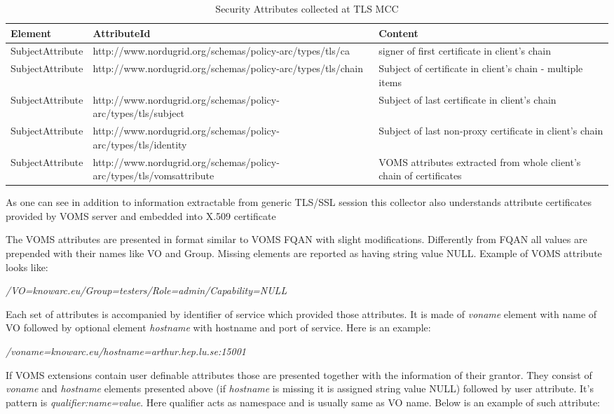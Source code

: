 \documentclass{book}
\begin{document}
\begin{table}[ht]
\caption{Security Attributes collected at TLS MCC}
\centering
\begin{tabular}{| l | p{7cm} | p{5cm} |}
\hline
\textbf{Element} & \textbf{AttributeId} & \textbf{Content} \\ \hline
SubjectAttribute & http://www.nordugrid.org/schemas/policy-arc/types/tls/ca & signer of first certificate in client's chain
 \\ \hline
SubjectAttribute & http://www.nordugrid.org/schemas/policy-arc/types/tls/chain & Subject of certificate in client's chain - multiple items \\ \hline
SubjectAttribute & http://www.nordugrid.org/schemas/policy-arc/types/tls/subject & Subject of last certificate in client's chain \\ \hline
SubjectAttribute & http://www.nordugrid.org/schemas/policy-arc/types/tls/identity & Subject of last non-proxy certificate in client's chain \\ \hline
SubjectAttribute & http://www.nordugrid.org/schemas/policy-arc/types/tls/vomsattribute & VOMS attributes extracted from whole client's chain of certificates \\ \hline
\end{tabular}
\label{table:tls_attr}
\end{table}

As one can see in addition to information extractable from generic TLS/SSL session this collector also understands attribute certificates provided by VOMS server and embedded into X.509 certificate

The VOMS attributes are presented in format similar to VOMS FQAN with slight modifications. Differently from FQAN all values are prepended with their names like VO and Group. Missing elements are reported as having string value NULL. Example of VOMS attribute looks like:

\emph{/VO=knowarc.eu/Group=testers/Role=admin/Capability=NULL}

Each set of attributes is accompanied by identifier of service which provided those attributes. It is made of \textit{voname} element with name of VO followed by optional element \textit{hostname} with hostname and port of service. Here is an example:

\emph{/voname=knowarc.eu/hostname=arthur.hep.lu.se:15001}

If VOMS extensions contain user definable attributes those are presented together with the information of their grantor. They consist of \textit{voname} and \textit{hostname} elements presented above (if \textit{hostname} is missing it is assigned string value NULL) followed by user attribute. It's pattern is \textit{qualifier:name=value}. Here qualifier acts as namespace and is usually same as VO name. Below is an example of such attribute:
\end{document}
